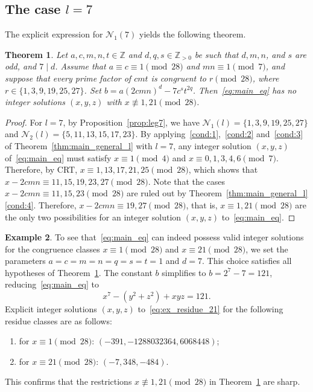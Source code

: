 \documentclass[11pt,a4paper]{amsart}
\newcommand{\ZZ}{\mathbb{Z}}
\theoremstyle{plain}
\newtheorem{theorem}{Theorem}[section]
\theoremstyle{definition}
\newtheorem{example}[theorem]{Example}
\begin{document}
\subsection{The case \texorpdfstring{$l = 7$}{l = 7}}
The explicit expression for $\mathcal{N}_1(7)$ yields the following theorem.
\begin{theorem}\label{thm:main7_gen}
Let $a, c, m, n, t \in \ZZ$ and $d, q, s \in \ZZ_{>0}$ be such that $d, m, n$, and $s$ are odd, and $7 \mid d$. Assume that $a \equiv c \equiv 1 \pmod{28}$ and $mn \equiv 1 \pmod{7}$, and suppose that every prime factor of $cmt$ is congruent to $r \pmod{28}$, where $r\in  \{1, 3, 9, 19, 25, 27\}$. Set $b = a  (2c m n)^d - 7c^s t^{2q}$. Then~\eqref{eq:main_eq} has no integer solutions $(x,y,z) $ with $x \not\equiv 1,21 \pmod{28}$.
\end{theorem}
\begin{proof}
    For $l=7$, by Proposition~\ref{prop:leg7}, we have $\mathcal{N}_1(l) = \{1, 3, 9, 19, 25, 27\} $ and $\mathcal{N}_2(l) = \{ 5, 11, 13, 15, 17, 23\}  $. By applying~\ref{cond:1},~\ref{cond:2} and~\ref{cond:3} of Theorem~\ref{thm:main_general_l} with $l=7$, any integer solution $(x,y,z)$ of~\eqref{eq:main_eq} must satisfy $x\equiv1\pmod{4}$ and $x \equiv 0,1,3,4,6\pmod{7}$. Therefore, by CRT, $x \equiv 1,13,17,21,25\pmod{28}$, which shows that $x-2cmn\equiv11,15,19,23,27\pmod{28}$. Note that the cases $x - 2cmn \equiv 11, 15, 23 \pmod{28}$ are ruled out by Theorem~\ref{thm:main_general_l}\ref{cond:4}. Therefore, $x-2cmn\equiv19,27\pmod{28}$, that is, $x\equiv 1,21\pmod{28}$ are the only two possibilities for an integer solution $(x,y,z)$ to~\eqref{eq:main_eq}.
\end{proof}
\begin{example}\label{ex:residue-21}
To see that~\eqref{eq:main_eq} can indeed possess valid integer solutions for the congruence classes $x \equiv 1 \pmod{28}$ and $x \equiv 21 \pmod{28}$, we set the parameters $a=c=m=n=q=s=t=1$ and $d=7$. This choice satisfies all hypotheses of Theorem~\ref{thm:main7_gen}. The constant $b$ simplifies to $b = 2^7 - 7 = 121$, reducing~\eqref{eq:main_eq} to
\begin{equation}\label{eq:ex_residue_21}
    x^7 - (y^2+z^2) + xyz = 121.
\end{equation}
Explicit integer solutions $(x, y, z)$ to~\eqref{eq:ex_residue_21} for the following residue classes are as follows:
\begin{enumerate}[label=(\alph*)]
\item for \textbf{$x \equiv 1 \pmod{28}$}: $(-391, -1288032364, 6068448)$;
    \item for \textbf{$x \equiv 21 \pmod{28}$}: $(-7, 348, -484)$.
\end{enumerate}
This confirms that the restrictions $x \not\equiv 1, 21 \pmod{28}$ in Theorem~\ref{thm:main7_gen} are sharp.
\end{example}
\end{document}
